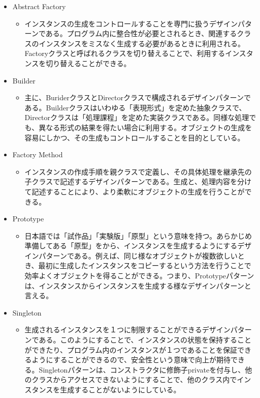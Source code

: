 \documentclass[dvipdfmx]{jsarticle}
\begin{document}
\begin{itemize}
  \item Abstract Factory
  \begin{itemize}
    \item インスタンスの生成をコントロールすることを専門に扱うデザインパターンである。プログラム内に整合性が必要とされるとき、関連するクラスのインスタンスをミスなく生成する必要があるときに利用される。Factoryクラスと呼ばれるクラスを切り替えることで、利用するインスタンスを切り替えることができる。
  \end{itemize}
  \item Builder
  \begin{itemize}
    \item 主に、BuriderクラスとDirectorクラスで構成されるデザインパターンである。Builderクラスはいわゆる「表現形式」を定めた抽象クラスで、Directorクラスは「処理課程」を定めた実装クラスである。同様な処理でも、異なる形式の結果を得たい場合に利用する。オブジェクトの生成を容易にしかつ、その生成もコントロールすることを目的としている。
  \end{itemize}
  \item Factory Method
  \begin{itemize}
    \item インスタンスの作成手順を親クラスで定義し、その具体処理を継承先の子クラスで記述するデザインパターンである。生成と、処理内容を分けて記述することにより、より柔軟にオブジェクトの生成を行うことができる。
  \end{itemize}
  \item Prototype
  \begin{itemize}
    \item 日本語では「試作品」「実験版」「原型」という意味を持つ。あらかじめ準備してある「原型」をから、インスタンスを生成するようにするデザインパターンである。例えば、同じ様なオブジェクトが複数欲しいとき、最初に生成したインスタンスをコピーするという方法を行うことで効率よくオブジェクトを得ることができる。つまり、Prototypeパターンは、インスタンスからインスタンスを生成する様なデザインパターンと言える。
  \end{itemize}
  \item Singleton
  \begin{itemize}
    \item 生成されるインスタンスを１つに制限することができるデザインパターンである。このようにすることで、インスタンスの状態を保持することができたり、プログラム内のインスタンスが１つであることを保証できるようにすることができるので、安全性という意味で向上が期待できる。Singletonパターンは、コンストラクタに修飾子privateを付与し、他のクラスからアクセスできないようにすることで、他のクラス内でインスタンスを生成することがないようにしている。
  \end{itemize}
\end{itemize}
\end{document}
